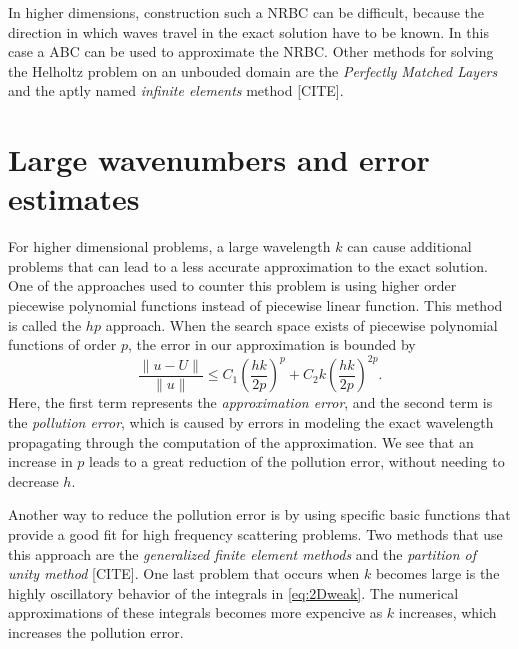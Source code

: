 \documentclass[a4paper]{article}
\begin{document}
In higher dimensions, construction such a NRBC can be difficult,
because the direction in which waves travel in the exact solution have
to be known. In this case a ABC can be used to approximate the NRBC.
Other methods for solving the Helholtz problem on an unbouded domain
are the \emph{Perfectly Matched Layers} and the aptly named
\emph{infinite elements} method [CITE].

\section{Large wavenumbers and error estimates}

For higher dimensional problems, a large wavelength $k$ can cause
additional problems that can lead to a less accurate approximation to
the exact solution. One of the approaches used to counter this problem
is using higher order piecewise polynomial functions instead of
piecewise linear function. This method is called the $hp$ approach.
When the search space exists of piecewise polynomial functions of
order $p$, the error in our approximation is bounded by
\begin{equation*}
  \frac{\lVert u - U \rVert}{\lVert u \rVert}
  \leq C_1 \left( \frac{hk}{2p} \right)^p
  + C_2 k \left( \frac{hk}{2p} \right)^{2p}.
\end{equation*}
Here, the first term represents the \emph{approximation error}, and
the second term is the \emph{pollution error}, which is caused by
errors in modeling the exact wavelength propagating through the
computation of the approximation. We see that an increase in $p$ leads
to a great reduction of the pollution error, without needing to
decrease $h$.

Another way to reduce the pollution error is by using specific basic
functions that provide a good fit for high frequency scattering
problems. Two methods that use this approach are the \emph{generalized
finite element methods} and the \emph{partition of unity method}
[CITE]. One last problem that occurs when $k$ becomes large is the
highly oscillatory behavior of the integrals in \eqref{eq:2Dweak}.
The numerical approximations of these integrals becomes more expencive
as $k$ increases, which increases the pollution error.
\end{document}
